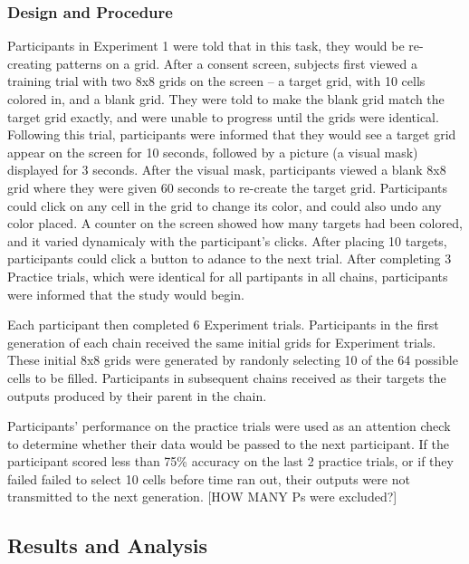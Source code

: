 \documentclass[10pt, letterpaper]{article}
\begin{document}
\hypertarget{design-and-procedure}{%
\subsubsection{Design and Procedure}\label{design-and-procedure}}

Participants in Experiment 1 were told that in this task, they would be
re-creating patterns on a grid. After a consent screen, subjects first
viewed a training trial with two 8x8 grids on the screen -- a target
grid, with 10 cells colored in, and a blank grid. They were told to make
the blank grid match the target grid exactly, and were unable to
progress until the grids were identical. Following this trial,
participants were informed that they would see a target grid appear on
the screen for 10 seconds, followed by a picture (a visual mask)
displayed for 3 seconds. After the visual mask, participants viewed a
blank 8x8 grid where they were given 60 seconds to re-create the target
grid. Participants could click on any cell in the grid to change its
color, and could also undo any color placed. A counter on the screen
showed how many targets had been colored, and it varied dynamicaly with
the participant's clicks. After placing 10 targets, participants could
click a button to adance to the next trial. After completing 3 Practice
trials, which were identical for all partipants in all chains,
participants were informed that the study would begin.

Each participant then completed 6 Experiment trials. Participants in the
first generation of each chain received the same initial grids for
Experiment trials. These initial 8x8 grids were generated by randonly
selecting 10 of the 64 possible cells to be filled. Participants in
subsequent chains received as their targets the outputs produced by
their parent in the chain.

Participants' performance on the practice trials were used as an
attention check to determine whether their data would be passed to the
next participant. If the participant scored less than 75\% accuracy on
the last 2 practice trials, or if they failed failed to select 10 cells
before time ran out, their outputs were not transmitted to the next
generation. {[}HOW MANY Ps were excluded?{]}

\hypertarget{results-and-analysis}{%
\subsection{Results and Analysis}\label{results-and-analysis}}
\end{document}
